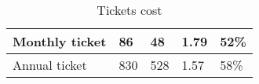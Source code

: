 \begin{table}[H]
\begin{tabular}{|l|l|l|l|l|}
Monthly ticket                                                                                        & 86                                 & 48                                                                                             & 1.79                                                                                              & 52\%                                                                                     \\ \hline
Annual ticket                                                                                         & 830                                & 528                                                                                            & 1.57                                                                                              & 58\%                                                                                     \\ \hline
\end{tabular}
\caption{Tickets cost}
\label{tab:ticket}
\end{table}